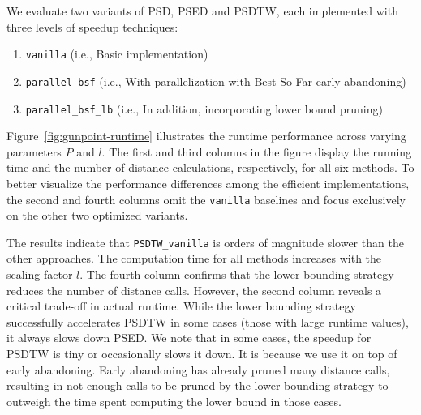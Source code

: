 \noindent{} 
We evaluate two variants of PSD, PSED and PSDTW, each implemented with three levels of speedup techniques: 
\begin{enumerate}
    \item \texttt{vanilla} (i.e., Basic implementation)
    \item \texttt{parallel\_bsf} (i.e., With parallelization with Best-So-Far early abandoning)
    \item \texttt{parallel\_bsf\_lb} (i.e., In addition, incorporating lower bound pruning)
\end{enumerate}


Figure~\ref{fig:gunpoint-runtime} illustrates the runtime performance across varying parameters $P$ and $l$. 
The first and third columns in the figure display the running time and the number of distance calculations, respectively, for all six methods. 
To better visualize the performance differences among the efficient implementations, the second and fourth columns omit the \texttt{vanilla} baselines and focus exclusively on the other two optimized variants.

The results indicate that \texttt{PSDTW\_vanilla} is orders of magnitude slower than the other approaches.
The computation time for all methods increases with the scaling factor $l$.
The fourth column confirms that the lower bounding strategy reduces the number of distance calls. 
However, the second column reveals a critical trade-off in actual runtime.
While the lower bounding strategy successfully accelerates PSDTW in some cases (those with large runtime values), it always slows down PSED. 
We note that in some cases, the speedup for PSDTW is tiny or occasionally slows it down.
It is because we use it on top of early abandoning.
Early abandoning has already pruned many distance calls, resulting in not enough calls to be pruned by the lower bounding strategy to outweigh the time spent computing the lower bound in those cases.

